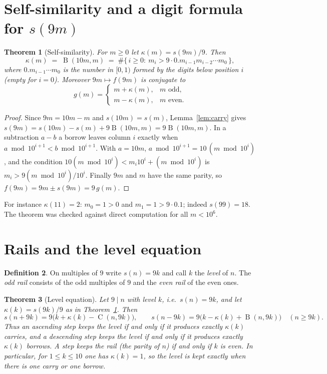\documentclass[11pt]{article}
\newtheorem{theorem}{Theorem}[section]
\theoremstyle{definition}
\newtheorem{definition}[theorem]{Definition}
\theoremstyle{remark}
\newcommand{\C}{\operatorname{C}}
\newcommand{\B}{\operatorname{B}}
\begin{document}
\section{Self-similarity and a digit formula for $s(9m)$}

\begin{theorem}[Self-similarity]\label{thm:self}
For $m\ge0$ let $\kappa(m)=s(9m)/9$. Then
\[
  \kappa(m)\;=\;\B(10m,m)\;=\;\#\bigl\{\,i\ge0:\ m_i>9\cdot 0.m_{i-1}m_{i-2}\cdots m_0\,\bigr\},
\]
where $0.m_{i-1}\cdots m_0$ is the number in $[0,1)$ formed by the digits
below position $i$ (empty for $i=0$). Moreover $9m\mapsto f(9m)$ is conjugate
to
\[
  g(m)=\begin{cases} m+\kappa(m), & m\text{ odd},\\ m-\kappa(m), & m\text{ even}.\end{cases}
\]
\end{theorem}

\begin{proof}
Since $9m=10m-m$ and $s(10m)=s(m)$, Lemma~\ref{lem:carry} gives
$s(9m)=s(10m)-s(m)+9\B(10m,m)=9\B(10m,m)$. In a subtraction $a-b$ a borrow
leaves column $i$ exactly when $a\bmod10^{i+1}<b\bmod10^{i+1}$. With $a=10m$,
$a\bmod10^{i+1}=10\,(m\bmod10^i)$, and the condition
$10(m\bmod10^i)<m_i10^i+(m\bmod10^i)$ is $m_i>9(m\bmod10^i)/10^i$. Finally
$9m$ and $m$ have the same parity, so $f(9m)=9m\pm s(9m)=9\,g(m)$.
\end{proof}

For instance $\kappa(11)=2$: $m_0=1>0$ and $m_1=1>9\cdot0.1$; indeed
$s(99)=18$. The theorem was checked against direct computation for all
$m<10^6$.

\section{Rails and the level equation}\label{sec:rails}

\begin{definition}
On multiples of $9$ write $s(n)=9k$ and call $k$ the \emph{level} of $n$.
The \emph{odd rail} consists of the odd multiples of $9$ and the \emph{even
rail} of the even ones.
\end{definition}

\begin{theorem}[Level equation]\label{thm:level}
Let $9\mid n$ with level $k$, i.e.\ $s(n)=9k$, and let $\kappa(k)=s(9k)/9$ as
in Theorem~\ref{thm:self}. Then
\[
  s(n+9k)=9\bigl(k+\kappa(k)-\C(n,9k)\bigr),\qquad
  s(n-9k)=9\bigl(k-\kappa(k)+\B(n,9k)\bigr)\quad(n\ge9k).
\]
Thus an ascending step keeps the level if and only if it produces exactly
$\kappa(k)$ carries, and a descending step keeps the level if and only if it
produces exactly $\kappa(k)$ borrows. A step keeps the rail (the parity of
$n$) if and only if $k$ is even. In particular, for $1\le k\le10$ one has
$\kappa(k)=1$, so the level is kept exactly when there is one carry or one
borrow.
\end{theorem}
\end{document}
